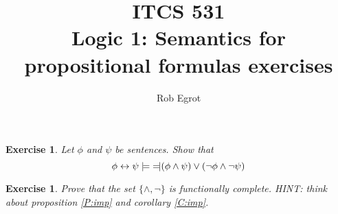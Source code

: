 \documentclass{article}
\title{ITCS 531 \\Logic 1: Semantics for propositional formulas exercises}
\author{Rob Egrot}
\date{}
\theoremstyle{plain}
\newtheorem{Q}[theorem]{Exercise}{\bfseries}{\upshape}
\newcommand{\lequiv}{\models\text{\reflectbox{$\models$}}}
\newcommand{\lra}{\leftrightarrow}
\begin{document}
\maketitle

\begin{Q}
Let $\phi$ and $\psi$ be sentences. Show that 
\[\phi\leftrightarrow \psi \lequiv (\phi \wedge \psi)\vee (\neg \phi \wedge \neg \psi)\]
\end{Q}
\begin{comment}
\textbf{Solution:}  
The truth tables are the same: 

\begin{tabular*}{0.75\textwidth}{@{\extracolsep{\fill} }  c  c  c  c }
  $\phi$ & $\psi$ & $\phi\leftrightarrow \psi$ & $(\phi \wedge \psi)\vee (\neg \phi \wedge \neg \psi)$ \\
  \hline 
   T & T & T & T  \\
	 T & F & F & F  \\
	 F & T & F & F  \\
	 F & F & T & T  
\end{tabular*}
\end{comment}
\begin{Q}
Prove that the set $\{\wedge,\neg\}$ is functionally complete. HINT: think about proposition \ref{P:imp} and corollary \ref{C:imp}. 
\end{Q}
\begin{comment}
\textbf{Solution:} 
To prove this we need to show that for every sentence $\phi$ there is a sentence $\phi'$ using only $\wedge$ and $\neg$ such that $\phi \lequiv\phi'$. In proposition \ref{P:imp} we already proved that $\{\wedge,\vee,\neg,\lra\}$ is functionally complete, so we can assume without loss of generality that $\phi$ only contains connectives from $\{\wedge,\vee,\neg,\lra\}$. 

As in the proof of corollary \ref{C:imp}, we use induction on formula construction. In the base case $\phi = p$ for some proposition symbol $p$. In this case we just set $\phi' = p$.

For the inductive step, suppose first that $\phi = \psi_1\vee \psi_2$, and we have already found $\psi_1'$ and $\psi_2'$. Then define $\phi' = \neg(\neg \psi_1'\wedge \neg\psi_2')$, and we can use truth tables to show $\phi\lequiv \phi'$.

Similarly, suppose $\phi = \psi_1\lra \psi_2$ and we have already found $\psi_1'$ and $\psi_2'$. Notice that $(\psi'_1 \wedge \psi'_2)\vee (\neg \psi'_1 \wedge \neg \psi'_2)\lequiv \psi_1\lra\psi_2$. So, using the first case we can define $\phi' = \neg\big( \neg(\psi'_1 \wedge \psi'_2)\wedge \neg(\neg \psi'_1 \wedge \neg \psi'_2)\big)$.

Finally, the cases where $\phi = \neg \psi$ and $\phi = \psi_1\wedge \psi_2$ are easy, because we can just set $\phi' = \neg \psi'$ or $\phi' =  \psi_1'\wedge \psi_2'$.
\end{comment}
\end{document}
